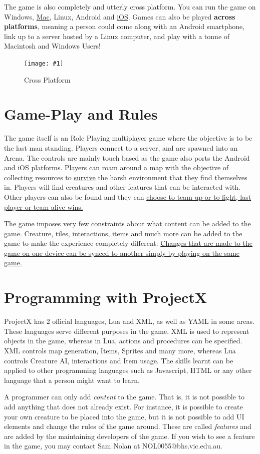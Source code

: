 \documentclass{book}
\newcommand{\hFigure}[2]
	{\begin{figure}[ht!]
		\centering
		\texttt{[image: \#1]}
		\caption{#2}
	\end{figure}}
\begin{document}
	The game is also completely and utterly cross platform. You can run the game on Windows, \underline{Mac}, Linux, Android and \underline{iOS}. Games can also be played \textbf{across platforms}, meaning a person could come along with an Android smartphone, link up to a server hosted by a Linux computer, and play with a tonne of Macintosh and Windows Users!

	\hFigure{CrossPlatform.png}{Cross Platform}

	\section{Game-Play and Rules}
	The game itself is an Role Playing multiplayer game where the objective is to be the last man standing. Players connect to a server, and are spawned into an Arena. The controls are mainly touch based as the game also ports the Android and iOS platforms. Players can roam around a map with the objective of collecting resources to \underline{survive} the harsh environment that they find themselves in. Players will find creatures and other features that can be interacted with. Other players can also be found and they can \underline{choose to team up or to fight, last player or team alive wins.}
	
	The game imposes very few constraints about what content can be added to the game. Creature, tiles, interactions, items and much more can be added to the game to make the experience completely different. \underline{Changes that are made to the game on one device can be synced to another simply by playing on the same game.}
	
	\section{Programming with ProjectX}
	ProjectX has 2 official languages, Lua and XML, as well as YAML in some areas. These languages serve different purposes in the game. XML is used to represent objects in the game, whereas in Lua, actions and procedures can be specified. XML controls map generation, Items, Sprites and many more, whereas Lua controls Creature AI, interactions and Item usage. The skills learnt can be applied to other programming languages such as Javascript, HTML or any other language that a person might want to learn.
	
	A programmer can only add \textit{content} to the game. That is, it is not possible to add anything that does not already exist. For instance, it is possible to create your own creature to be placed into the game, but it is not possible to add UI elements and change the rules of the game around. These are called \textit{features} and are added by the maintaining developers of the game. If you wish to see a feature in the game, you may contact Sam Nolan at NOL0055@bhs.vic.edu.au.
	
\end{document}
